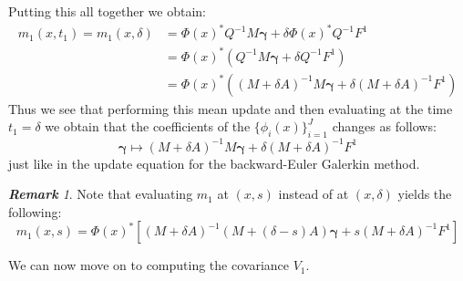 \documentclass{article}
\theoremstyle{definition}
\theoremstyle{remark}
\newtheorem*{remark}{\textbf{Remark}}  %
\theoremstyle{remark}
\begin{document}
Putting this all together we obtain:
\begin{align*}
    m_{1}(x,t_{1}) = m_{1}(x,\delta) &= \Phi(x)^{*}Q^{-1}M\boldsymbol{\gamma} + \delta\Phi(x)^{*}Q^{-1}F^{1} \\
    &= \Phi(x)^{*}(Q^{-1}M\boldsymbol{\gamma}+\delta Q^{-1}F^{1}) \\
    &= \Phi(x)^{*}((M+\delta A)^{-1}M\boldsymbol{\gamma}+\delta (M+\delta A)^{-1}F^{1})
\end{align*}
Thus we see that performing this mean update and then evaluating at the time $t_{1}=\delta$ we obtain that the coefficients of the $\{\phi_{i}(x)\}_{i=1}^{J}$ changes as follows:
\begin{equation}
    \boldsymbol{\gamma} \longmapsto (M+\delta A)^{-1}M\boldsymbol{\gamma}+\delta (M+\delta A)^{-1}F^{1}
\end{equation}
just like in the update equation for the backward-Euler Galerkin method. \vspace{10pt}
\begin{remark}
    Note that evaluating $m_{1}$ at $(x,s)$ instead of at $(x,\delta)$ yields the following:
    \begin{equation}
        m_{1}(x,s)=\Phi(x)^{*}[(M+\delta A)^{-1}(M+(\delta-s)A)\boldsymbol{\gamma}+s (M+\delta A)^{-1}F^{1}]
    \end{equation}
\end{remark}

We can now move on to computing the covariance $V_{1}$.
\end{document}
